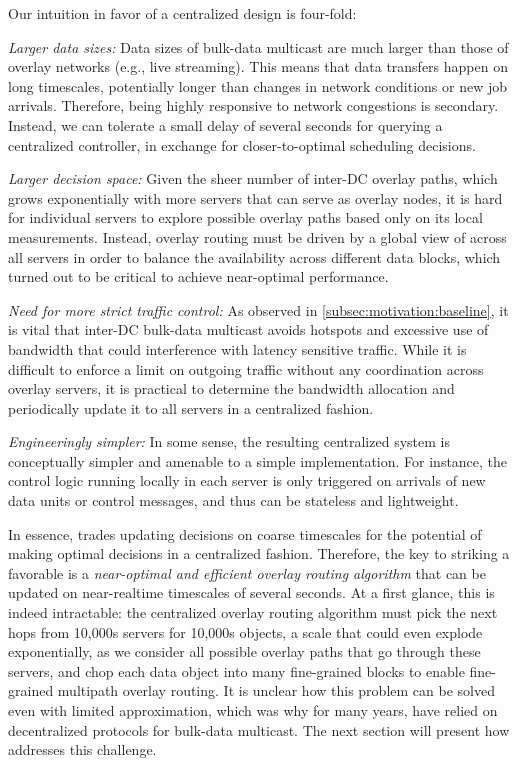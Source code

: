 Our intuition in favor of a centralized design is four-fold:
\begin{packedenumerate}
\item {\em Larger data sizes:}
Data sizes of bulk-data multicast are much larger
than those of overlay networks (e.g., live streaming).
This means that data transfers happen on long timescales,
potentially longer than changes in network conditions or
new job arrivals.
Therefore, being highly responsive to network congestions
is secondary.
Instead, we can tolerate a small delay of several seconds for
querying a centralized controller,
in exchange for closer-to-optimal scheduling decisions.
\item {\em Larger decision space:}
Given the sheer number of inter-DC overlay paths,
which grows exponentially with more servers that can
serve as overlay nodes,
it is hard for individual servers to explore possible overlay
paths based only on its local measurements.
Instead, overlay routing must be driven by a global
view of across all servers in order to
balance the availability across different data blocks, which
turned out to be critical to achieve near-optimal performance.
\item {\em Need for more strict traffic control:}
As observed in \Section\ref{subsec:motivation:baseline}, it is vital that inter-DC
bulk-data multicast avoids hotspots and excessive use of
bandwidth that could interference with latency sensitive traffic.
While it is difficult to enforce a limit on outgoing traffic
without any coordination across overlay servers, it is practical
to determine the bandwidth allocation and periodically update it
to all servers in a centralized fashion.
\item {\em Engineeringly simpler:}
In some sense, the resulting centralized system is conceptually
simpler and amenable to a simple implementation.
For instance, the control logic running locally in each server
is only triggered on arrivals of new data units or control messages,
and thus can be stateless and lightweight.

\end{packedenumerate}

In essence, \name trades updating decisions on coarse timescales
for the potential of making optimal decisions in a centralized
fashion.
Therefore, the key to striking a favorable is a
{\em near-optimal and efficient overlay routing
algorithm} that can be updated on near-realtime timescales of
several seconds.
At a first glance, this is indeed intractable:
the centralized overlay routing algorithm must pick the next hops
from 10,000s servers for 10,000s objects, a scale that could
even explode exponentially, as we consider all possible
overlay paths that go through these servers, and chop each data
object into many fine-grained blocks to enable fine-grained
multipath overlay routing.
It is unclear how this problem can be solved even with
limited approximation, which was why for many years, \company have
relied on decentralized protocols for bulk-data multicast.
The next section  will present how \name addresses this
challenge.

